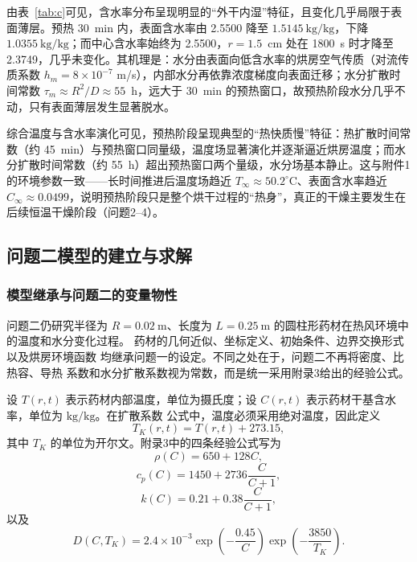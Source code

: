 \documentclass[12pt,a4paper]{article}
\renewcommand{\boxed}[1]{#1}
\begin{document}
由表~\ref{tab:c}可见，含水率分布呈现明显的``外干内湿''特征，且变化几乎局限于表面薄层。预热 30~min 内，表面含水率由 2.5500 降至 $1.5145\ \mathrm{kg/kg}$，下降 $1.0355\ \mathrm{kg/kg}$；而中心含水率始终为 2.5500，$r=1.5$~cm 处在 1800~s 时才降至 2.3749，几乎未变化。其机理是：水分由表面向低含水率的烘房空气传质（对流传质系数 $h_m=8\times10^{-7}$ m/s），内部水分再依靠浓度梯度向表面迁移；水分扩散时间常数 $\tau_m\approx R^2/D\approx55$~h，远大于 30~min 的预热窗口，故预热阶段水分几乎不动，只有表面薄层发生显著脱水。

综合温度与含水率演化可见，预热阶段呈现典型的``热快质慢''特征：热扩散时间常数（约 45~min）与预热窗口同量级，温度场显著演化并逐渐逼近烘房温度；而水分扩散时间常数（约 55~h）超出预热窗口两个量级，水分场基本静止。这与附件1 的环境参数一致——长时间推进后温度场趋近 $T_\infty\approx50.2^\circ\mathrm{C}$、表面含水率趋近 $C_\infty\approx0.0499$，说明预热阶段只是整个烘干过程的``热身''，真正的干燥主要发生在后续恒温干燥阶段（问题2--4）。


\subsection{问题二模型的建立与求解}

\subsubsection{模型继承与问题二的变量物性}

问题二仍研究半径为 $R=0.02\ \mathrm{m}$、长度为
$L=0.25\ \mathrm{m}$ 的圆柱形药材在热风环境中的温度和水分变化过程。
药材的几何近似、坐标定义、初始条件、边界交换形式以及烘房环境函数
均继承问题一的设定。不同之处在于，问题二不再将密度、比热容、导热
系数和水分扩散系数视为常数，而是统一采用附录3给出的经验公式。

设 $T(r,t)$ 表示药材内部温度，单位为摄氏度；设
$C(r,t)$ 表示药材干基含水率，单位为 $\mathrm{kg/kg}$。在扩散系数
公式中，温度必须采用绝对温度，因此定义
\begin{equation}
T_K(r,t)=T(r,t)+273.15,
\end{equation}
其中 $T_K$ 的单位为开尔文。附录3中的四条经验公式写为
\begin{equation}
\boxed{
\rho(C)=650+128C
},
\end{equation}
\begin{equation}
\boxed{
c_p(C)=1450+2736\frac{C}{C+1}
},
\end{equation}
\begin{equation}
\boxed{
k(C)=0.21+0.38\frac{C}{C+1}
},
\end{equation}
以及
\begin{equation}
\boxed{
D(C,T_K)
=
2.4\times10^{-3}
\exp\left(-\frac{0.45}{C}\right)
\exp\left(-\frac{3850}{T_K}\right)
}.
\end{equation}
\end{document}
